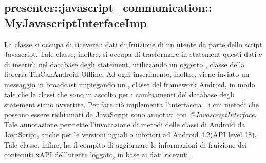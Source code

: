 \documentclass[../Tesi.tex]{subfiles}
\begin{document}
		\subsection{presenter::javascript\_communication::\\MyJavascriptInterfaceImp}
		La classe  si occupa di ricevere i dati di fruizione di un utente da parte dello script Javascript. Tale classe, inoltre, si occupa di trasformare in statement questi dati e di inserirli nel database degli statement, utilizzando un oggetto , classe della libreria TinCanAndroid-Offline. Ad ogni inserimento, inoltre, viene inviato un messaggio in broadcast impiegando un , classe del framework Android, in modo tale che le classi che sono in ascolto per i cambiamenti del database degli statement siano avvertite. Per fare ciò implementa l'interfaccia , i cui metodi che possono essere richiamati da JavaScript sono annotati con \textit{@JavascriptInterface}. Tale annotazione permette l'invocazione di metodi delle classi di Android da JavaScript, anche per le versioni uguali o inferiori ad Android 4.2(API level 18). Tale classe, infine, ha il compito di aggiornare le informazioni di fruizione dei contenuti xAPI dell'utente loggato, in base ai dati ricevuti. 
\end{document}
